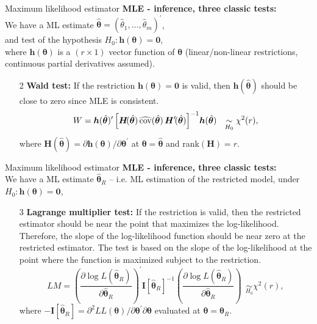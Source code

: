 \documentclass{beamer}
\begin{document}
\begin{frame}{Maximum likelihood estimator}
\textbf{MLE - inference, three classic tests:}\\ \bigskip
We have a ML estimate $\hat{\bm{\theta}}=(\hat{\theta}_1, \dots, \hat{\theta}_m)^{\prime}$,\\
and test of the hypothesis $H_0 : \bm{h}(\bm{\theta}) = \bm{0}$,\\
where $\bm{h}(\bm{\theta})$ is a $(r \times 1)$ vector function of $\bm{\theta}$ (linear/non-linear restrictions, continuous partial derivatives assumed).
\bigskip
\begin{itemize}
    \item[2] \textbf{Wald test:} If the restriction $\bm{h}(\bm{\theta}) = \bm{0}$ is valid, then $\bm{h}(\hat{\bm{\theta}})$ should be close to zero since MLE is consistent.\\ \medskip
    $$
    W = \bm{h}(\hat{\bm{\theta}})^{\prime}
    \left[ \bm{H}\!(\hat{\bm{\theta}}) \, \widehat{\textnormal{cov}}
    (\hat{\bm{\theta}}) \, \bm{H}^{\prime}\!(\hat{\bm{\theta}})
    \right]^{-1} \! \bm{h}(\hat{\bm{\theta}})
    ~~\underset{H_0}{\sim} \chi^2(r),
    $$
    where $\bm{H}(\hat{\bm{\theta}})= \partial \bm{h}(\bm{\theta}) / \partial \bm{\theta}^{\prime}$ at $\bm{\theta} = \hat{\bm{\theta}}$ and rank$(\bm{H})=r$.
\end{itemize}
\end{frame}
\begin{frame}{Maximum likelihood estimator}
\textbf{MLE - inference, three classic tests:}\\ \bigskip
We have a ML estimate $\hat{\bm{\theta}}_R$ -- i.e. ML estimation of the restricted model, under $H_0 : \bm{h}(\bm{\theta}) = \bm{0}$,\\ \medskip
\begin{itemize}
    \item[3] \textbf{Lagrange multiplier test:} If the restriction is valid, then the restricted estimator should be near the point that maximizes the log-likelihood. Therefore, the slope of the log-likelihood function should be near zero at the restricted estimator. The test is based on the slope of the log-likelihood at the point where the function is maximized subject to the restriction.\\ \smallskip
    $$
    \textit{LM} = 
    \left( \frac{\partial \log L(\hat{\bm{\theta}}_R)}{\partial \hat{\bm{\theta}}_R} \right)^{\prime}
    \bm{I}[\hat{\bm{\theta}}_R]^{-1}
    \left( \frac{\partial \log L(\hat{\bm{\theta}}_R)}{\partial \hat{\bm{\theta}}_R} \right)
    ~~\underset{H_0}{\sim} \chi^2(r),
    $$
    where $-\bm{I}[\hat{\bm{\theta}}_R]= \partial^2 LL(\bm{\theta}) / \partial \bm{\theta}^{\prime} \partial \bm{\theta}$ evaluated at $\bm{\theta}=\hat{\bm{\theta}}_R$.
\end{itemize}

\end{frame}
\end{document}

